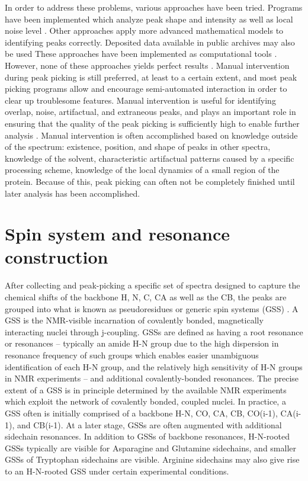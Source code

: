 In order to address these problems, various approaches have been tried.  
Programs have been implemented which analyze peak shape and intensity as 
well as local noise level \cite{munin, autopsy}.  Other approaches 
apply more advanced mathematical models to identifying peaks correctly.  
Deposited data available in public archives may also be used 
These approaches have been implemented as computational tools 
\cite{williamson2009automated, guerry2011automated}.
However, none of these approaches yields perfect 
results \cite{guerry2011automated}.  Manual intervention during peak picking 
is still preferred, at least to a certain extent, and most peak picking 
programs allow and encourage semi-automated interaction in order to clear 
up troublesome features.  Manual intervention is useful for identifying 
overlap, noise, artifactual, and extraneous peaks, 
and plays an important role in ensuring that the quality of the peak picking 
is sufficiently high to enable further analysis \cite{guntert2009automated}.  
Manual intervention is often accomplished based on knowledge outside of the 
spectrum: existence, position, and shape of peaks in other spectra, knowledge 
of the solvent, characteristic artifactual patterns caused by a specific 
processing scheme, knowledge of the local dynamics of a small region of the 
protein.  \cite{williamson2009automated, guntert2009automated, 
altieri2004automation, baran2004automated}
Because of this, peak picking can often not be completely finished until 
later analysis has been accomplished.


\section{Spin system and resonance construction}

After collecting and peak-picking a specific set of spectra designed to 
capture the chemical shifts of the backbone H, N, C, CA as well as the CB, 
the peaks are grouped into what is known as pseudoresidues \cite{mars} 
or generic spin systems (GSS) 
\cite{saga, ezassign, pistachio, autoassign1997, autoassign2001}.  
A GSS is the NMR-visible incarnation of covalently bonded, magnetically 
interacting nuclei through j-coupling.  GSSs are defined as having a root 
resonance or resonances -- typically an amide H-N group due to the high 
dispersion in resonance frequency of such groups which enables easier 
unambiguous identification of each H-N group, and the relatively high 
sensitivity of H-N groups in NMR experiments -- and additional 
covalently-bonded resonances.  The precise extent of a GSS is in principle 
determined by the available NMR experiments which exploit the network of 
covalently bonded, coupled nuclei.  In practice, a GSS often is initially 
comprised of a backbone H-N, CO, CA, CB, CO(i-1), CA(i-1), and CB(i-1).  
At a later stage, GSSs are often augmented with additional sidechain resonances.  
In addition to GSSs of backbone resonances, H-N-rooted GSSs typically are 
visible for Asparagine and Glutamine sidechains, and smaller GSSs of 
Tryptophan sidechains are visible.  Arginine sidechains may also give rise 
to an H-N-rooted GSS under certain experimental conditions. 
	
